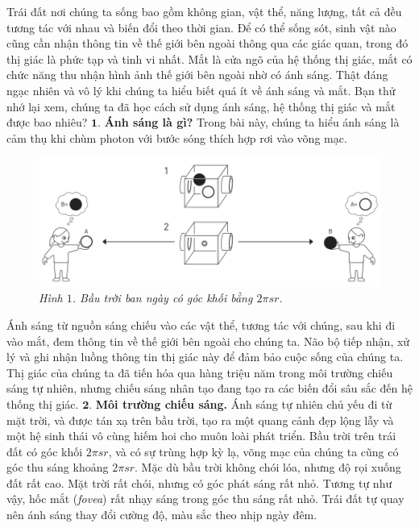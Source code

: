 \begin{multicols}{2}
	Trái đất nơi chúng ta sống bao gồm không gian, vật thể, năng lượng, tất cả đều tương tác với nhau và biến đổi theo thời gian. Để có thể sống sót, sinh vật nào cũng cần nhận thông tin về thế giới bên ngoài thông qua các giác quan, trong đó thị giác là phức tạp và tinh vi nhất. Mắt là cửa ngõ của hệ thống thị giác, mắt có chức năng thu nhận hình ảnh thế giới bên ngoài nhờ có ánh sáng.
	\vskip 0.1cm
	Thật đáng ngạc nhiên và vô lý khi chúng ta hiểu biết quá ít về ánh sáng và mắt. Bạn thử nhớ lại xem, chúng ta đã học cách sử dụng ánh sáng, hệ thống thị giác và mắt được bao nhiêu? 
	\vskip 0.1cm
	$\pmb{1.}$ \textbf{\color{timhieukhoahoc}Ánh sáng là gì?}
	\vskip 0.1cm
	Trong bài này, chúng ta hiểu ánh sáng là cảm thụ khi chùm photon với bước sóng thích hợp rơi vào võng mạc. 
	\begin{figure}[H]
		\vspace*{-5pt}
		\centering
		\captionsetup{labelformat= empty, justification=centering}
		\includegraphics[width= 1\linewidth]{1}
		\caption{\small\textit{\color{timhieukhoahoc}Hình $1$. Bầu trời ban ngày có góc khối bằng $2\pi sr$.}}
		\vspace*{-10pt}
	\end{figure}
	Ánh sáng từ nguồn sáng chiếu vào các vật thể, tương tác với chúng, sau khi đi vào mắt, đem thông tin về thế giới bên ngoài cho chúng ta. Não bộ tiếp nhận, xử lý và ghi nhận luồng thông tin thị giác này để đảm bảo cuộc sống của chúng ta. Thị giác của chúng ta đã tiến hóa qua hàng triệu năm trong môi trường chiếu sáng tự nhiên, nhưng chiếu sáng nhân tạo đang tạo ra các biến đổi sâu sắc đến hệ thống thị giác.
	\vskip 0.1cm
	$\pmb{2.}$	\textbf{\color{timhieukhoahoc}Môi trường chiếu sáng.}
	\vskip 0.1cm
	Ánh sáng tự nhiên chủ yếu đi từ mặt trời, và được tán xạ trên bầu trời, tạo ra một quang cảnh đẹp lộng lẫy và một hệ sinh thái vô cùng hiếm hoi cho muôn loài phát triển.
	\vskip 0.1cm
	Bầu trời trên trái đất có góc khối $2\pi sr$, và có sự trùng hợp kỳ lạ, võng mạc của chúng ta cũng có góc thu sáng khoảng $2\pi sr$. Mặc dù bầu trời không chói lóa, nhưng độ rọi xuống đất rất cao. Mặt trời rất chói, nhưng có góc phát sáng rất nhỏ. Tương tự như vậy, hốc mắt (\textit{fovea}) rất nhạy sáng trong góc thu sáng rất nhỏ. Trái đất tự quay nên ánh sáng thay đổi cường độ, màu sắc theo nhịp ngày đêm.

\end{multicols}
